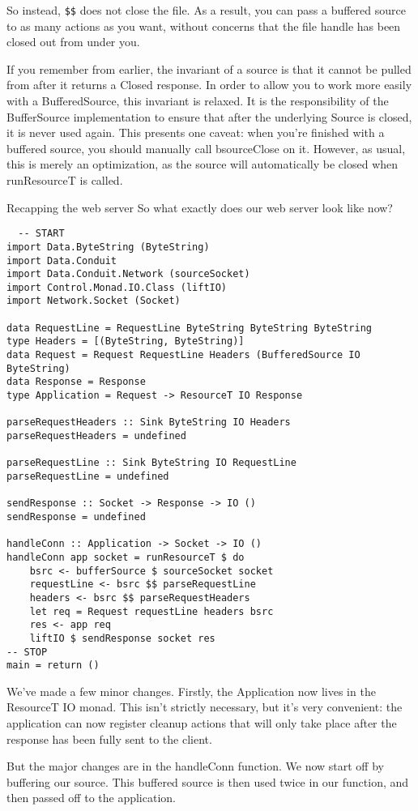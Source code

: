 So instead, \verb#$$# does not close the file. As a result, you can pass a
buffered source to as many actions as you want, without concerns that the file handle has
been
closed out from under you.

If you remember from earlier, the invariant of a source is that it cannot be pulled from
after it returns a Closed response. In order to allow you to work more easily
with a BufferedSource, this invariant is relaxed. It is the responsibility of
the BufferSource implementation to ensure that after the underlying
Source is closed, it is never used again.
This presents one caveat: when you're finished with a buffered source, you should manually
call
bsourceClose on it. However, as usual, this is merely an optimization, as the
source will automatically be closed when runResourceT is called.

Recapping the web server
So what exactly does our web server look like now?
\begin{lstlisting}
  -- START
import Data.ByteString (ByteString)
import Data.Conduit
import Data.Conduit.Network (sourceSocket)
import Control.Monad.IO.Class (liftIO)
import Network.Socket (Socket)

data RequestLine = RequestLine ByteString ByteString ByteString
type Headers = [(ByteString, ByteString)]
data Request = Request RequestLine Headers (BufferedSource IO ByteString)
data Response = Response
type Application = Request -> ResourceT IO Response

parseRequestHeaders :: Sink ByteString IO Headers
parseRequestHeaders = undefined

parseRequestLine :: Sink ByteString IO RequestLine
parseRequestLine = undefined

sendResponse :: Socket -> Response -> IO ()
sendResponse = undefined

handleConn :: Application -> Socket -> IO ()
handleConn app socket = runResourceT $ do
    bsrc <- bufferSource $ sourceSocket socket
    requestLine <- bsrc $$ parseRequestLine
    headers <- bsrc $$ parseRequestHeaders
    let req = Request requestLine headers bsrc
    res <- app req
    liftIO $ sendResponse socket res
-- STOP
main = return ()
\end{lstlisting}
We've made a few minor changes. Firstly, the Application now lives in the
ResourceT IO monad. This isn't strictly necessary, but it's very convenient:
the application can now register cleanup actions that will only take place after the
response has
been fully sent to the client.

But the major changes are in the handleConn function. We now start off by
buffering our source. This buffered source is then used twice in our function, and then
passed
off to the application.


